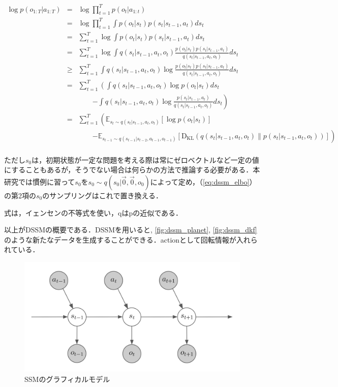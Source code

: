 \begin{eqnarray}
  \log p(o_{1:T}|a_{1:T})
  &=& \log \prod_{t=1}^T p(o_t|a_{1:t}) \nonumber \\
  &=& \log \prod_{t=1}^T \int p(o_t|s_t) p(s_t|s_{t-1}, a_t)ds_t \nonumber \\
  &=& \sum_{t=1}^T \log \int p(o_t|s_t) p(s_t|s_{t-1}, a_t)ds_t \nonumber \\
  &=& \sum_{t=1}^T \log \int q(s_t|s_{t-1}, a_t, o_t) \frac{p(o_t|s_t) p(s_t|s_{t-1}, a_t)}{q(s_t|s_{t-1}, a_t, o_t)}ds_t \nonumber \\
  &\geq& \sum_{t=1}^T \int q(s_t|s_{t-1}, a_t, o_t) \log \frac{p(o_t|s_t) p(s_t|s_{t-1}, a_t)}{q(s_t|s_{t-1}, a_t, o_t)}ds_t \nonumber \\
  &=& \sum_{t=1}^T \left( \int q(s_t|s_{t-1}, a_t, o_t) \log p(o_t|s_t)ds_t \right. \nonumber \\
  && \hspace{2em} \left. - \int q(s_t|s_{t-1}, a_t, o_t) \log \frac{p(s_t|s_{t-1}, a_t)}{q(s_t|s_{t-1}, a_t, o_t)}ds_t \right) \nonumber \\
  &=& \sum_{t=1}^T \left( \mathbb{E}_{s_t \sim q(s_t|s_{t-1}, a_t, o_t)} [\log p(o_t|s_t)] \right. \nonumber \\
  && \hspace{2em} \left. - \mathbb{E}_{s_{t-1} \sim q(s_{t-1}|s_{t-2}, a_{t-1}, o_{t-1})} [\mathrm{D_{KL}}(q(s_t|s_{t-1}, a_t, o_t) \| p(s_t|s_{t-1}, a_t, o_t))] \right)  \nonumber \\
  \label{eq:dssm_elbo}
\end{eqnarray}

ただし$s_0$は，初期状態が一定な問題を考える際は常にゼロベクトルなど一定の値にすることもあるが，そうでない場合は何らかの方法で推論する必要がある．本研究では慣例に習って$s_0$を$s_0 \sim q(s_0|\vec{0}, \vec{0}, o_0) $によって定め，（\ref{eq:dssm_elbo}）の第2項の$s_0$のサンプリングはこれで置き換える．

式は，イェンセンの不等式を使い，qはpの近似である．

以上がDSSMの概要である．DSSMを用いると, \ref{fig:dssm_planet}, \ref{fig:dssm_dkf}のような新たなデータを生成することができる．actionとして回転情報が入れられている．

\begin{figure}[tbp]
  \begin{center}
    \includegraphics[width=\linewidth]{./figures/dssm.png}
    \caption{SSMのグラフィカルモデル}
    \label{fig:ssm}
  \end{center}
\end{figure}

